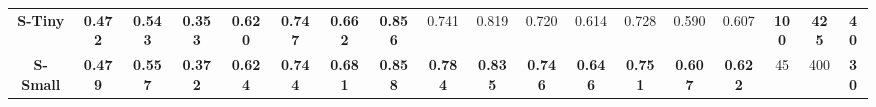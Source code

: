 \begin{table}[th!]
{\begin{tabular}{c |c c  c  |c c  |c c |c c  c |c c |c c |c c c}
	
	\rowcolor{lightgray!20} \bf{S-Tiny}  &  \color{RoyalBlue} \bf{0.472} &  \color{RoyalBlue} \bf{0.543} &  \color{RoyalBlue} \bf{0.353}  &  \color{RoyalBlue} \bf{0.620}  &  \color{Mahogany} \bf{0.747} &  \color{RoyalBlue} \bf{0.662} &  \color{RoyalBlue} \bf{0.856} & 0.741  & 0.819  & 0.720 & 0.614  & 0.728 & 0.590  &  0.607  &  \color{Mahogany} \bf{100} & \color{RoyalBlue} \bf{425} & \color{Mahogany} \bf{40}\\
	\rowcolor{lightgray!20} \bf{S-Small} &  \color{Mahogany} \bf{0.479} &  \color{Mahogany} \bf{0.557} &  \color{Mahogany} \bf{0.372}  &  \color{Mahogany} \bf{0.624}  & \color{ForestGreen} \bf{0.744} &  \color{Mahogany} \bf{0.681}  &  \color{Mahogany} \bf{0.858} & \color{RoyalBlue} \bf{0.784}  & \color{RoyalBlue} \bf{0.835}  & \color{RoyalBlue} \bf{0.746} & \color{Mahogany} \bf{0.646}  &  \color{Mahogany} \bf{0.751}  & \color{RoyalBlue} \bf{0.607}  & \color{RoyalBlue} \bf{0.622}  &  45 & 400 & \color{RoyalBlue} \bf{30}\\
	\hline
	\end{tabular}
	}
	\vspace{-4mm}
  \end{table}
  
  
  
  
  

